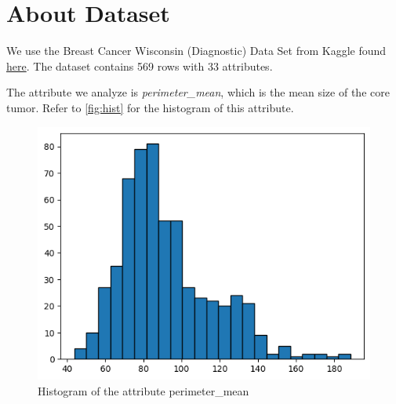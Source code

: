 \section{About Dataset}

We use the Breast Cancer Wisconsin (Diagnostic) Data Set from Kaggle found \href{https://www.kaggle.com/datasets/uciml/breast-cancer-wisconsin-data}{here}.
The dataset contains 569 rows with 33 attributes.

The attribute we analyze is \textit{perimeter\_mean}, which is the mean size of the core tumor.
Refer to \autoref{fig:hist} for the histogram of this attribute.

\begin{figure}[!ht]
  \centering
  \includegraphics[width=.5\textwidth]{images/data-hist.png}
  \caption{Histogram of the attribute perimeter\_mean}
  \label{fig:hist}
\end{figure}
